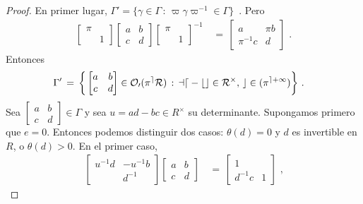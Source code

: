 \begin{proof}
	En primer lugar,
	\begin{math}
		\Gamma'=\big\{\gamma\in\Gamma\,:\,
			\varpi\gamma\varpi^{-1}\in\Gamma\big\}
	\end{math}~.
	Pero
	\begin{align*}
		\begin{bmatrix} \pi & \\ & 1 \end{bmatrix}
			\begin{bmatrix} a & b \\ c & d \end{bmatrix}
			\begin{bmatrix} \pi & \\ & 1 \end{bmatrix}^{-1}
		& \,=\,\begin{bmatrix} a & \pi b \\ \pi^{-1}c & d \end{bmatrix}
		\text{ .}
	\end{align*}
	Entonces
	\begin{align*}
		\Gamma' & \,=\,\bigg\{
			\begin{bmatrix} a & b \\ c & d \end{bmatrix}
			\in\cal{O}_{0}(\pi^{e}R)\,:\,
			ad-bc\in R^{\times},\,c\in (\pi^{e+1})\bigg\}
		\text{ .}
	\end{align*}
	Sea
	\begin{math}
		\begin{bmatrix} a & b \\ c & d \end{bmatrix}\in\Gamma
	\end{math}
	y sea $u=ad-bc\in R^{\times}$ su determinante. Supongamos primero que
	$e=0$. Entonces podemos distinguir dos casos: $\theta(d)=0$ y $d$ es
	invertible en $R$, o $\theta(d)>0$. En el primer caso,
	\begin{align*}
		\begin{bmatrix} u^{-1}d & -u^{-1}b \\ & d^{-1} \end{bmatrix}
			\begin{bmatrix} a & b \\ c & d \end{bmatrix}
		& \,=\, \begin{bmatrix} 1 & \\ d^{-1}c & 1 \end{bmatrix}
		\text{ ,}
	\end{align*}

\end{proof}
